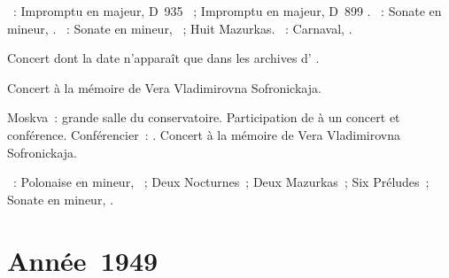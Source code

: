 \begin{description}
 \textsc{\Schubert{}}~: Impromptu en \kA \Flat majeur, D~935 ~;
 Impromptu en \kA \Flat majeur, D~899 .
 \textsc{\Beethoven{}}~: Sonate  en \kC \Sharp mineur, 
 .
 \textsc{\Chopin{}}~: Sonate  en \kB \Flat mineur, ~;
 Huit Mazurkas.
 \textsc{\Schumann{}}~: Carnaval, .
 \item[\DateWithWeekDay{1948-12-02}]
 Concert dont la date n'apparaît que dans les archives d'\AVizel{}
 \citep[voir][p.~169]{Nekrasova08}.
 \item[\DateWithWeekDay{1948-12-21}]
 Concert à la mémoire de Vera Vladimirovna Sofronickaja.
 \item[\DateWithWeekDay{1948-12-23}]
 Moskva~: grande salle du conservatoire.
 Participation de \VSofronitsky{} à un concert et conférence.
 Conférencier~: \IMartinov{}.
 Concert à la mémoire de Vera Vladimirovna Sofronickaja.

 \textsc{\Chopin{}}~: Polonaise en \kC \Sharp mineur,  ~;
 Deux Nocturnes~; Deux Mazurkas~; Six Préludes~; Sonate en \kB \Flat mineur,
 .
\end{description}

\section{Année~1949}

